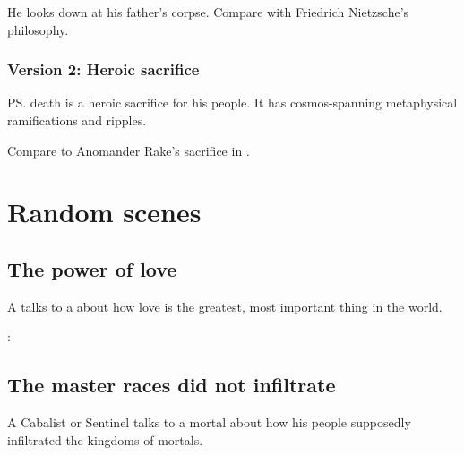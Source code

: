He looks down at his father's corpse. 
Compare with Friedrich Nietzsche's philosophy.





\subsubsection{Version 2: Heroic sacrifice}
\ps{\Secherdamon} death is a heroic sacrifice for his people. 
It has cosmos-spanning metaphysical ramifications and ripples. 

Compare to Anomander Rake's sacrifice in \cite{StevenErikson:TolltheHounds}. 















\section{Random scenes}









\subsection{The power of love}
A \human{} talks to a \resphan{} about how love is the greatest, most important thing in the world. 

\Resphan: 









\subsection{The master races did not infiltrate}
A Cabalist or Sentinel talks to a mortal about how his people supposedly infiltrated the kingdoms of mortals.

